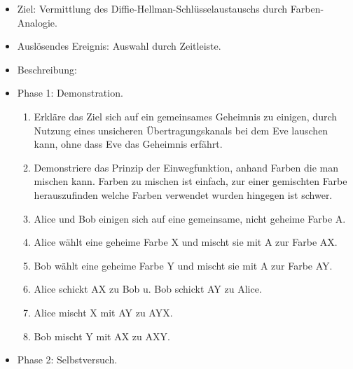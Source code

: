 \documentclass{article}
\begin{document}
\begin{itemize}[label={}]

 \item Ziel: Vermittlung des Diffie-Hellman-Schlüsselaustauschs durch Farben-Analogie.

 \item Auslösendes Ereignis: Auswahl durch Zeitleiste.

 \item Beschreibung:

 \item Phase 1: Demonstration.

	\begin{enumerate}[]
     \item Erkläre das Ziel sich auf ein gemeinsames Geheimnis zu einigen,
        durch Nutzung eines unsicheren Übertragungskanals
        bei dem Eve lauschen kann, ohne dass Eve das Geheimnis erfährt.
     \item Demonstriere das Prinzip der Einwegfunktion, anhand Farben die man mischen
        kann. Farben zu mischen ist einfach, zur einer gemischten Farbe
        herauszufinden welche Farben verwendet wurden hingegen ist schwer.
     \item Alice und Bob einigen sich auf eine gemeinsame, nicht geheime Farbe A.
     \item Alice wählt eine geheime Farbe X und mischt sie mit A zur Farbe AX.
     \item Bob wählt eine geheime Farbe Y und mischt sie mit A zur Farbe AY.
     \item Alice schickt AX zu Bob u. Bob schickt AY zu Alice.
     \item Alice mischt X mit AY zu AYX.
     \item Bob mischt Y mit AX zu AXY.
	\end{enumerate}

 \item Phase 2: Selbstversuch.


\end{itemize}
\end{document}
